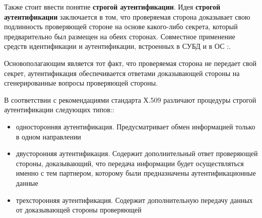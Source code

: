 Также стоит ввести понятие \textbf{строгой аутентификации}. Идея \textbf{строгой аутентификации}
заключается в том, что проверяемая сторона доказывает свою подлинность проверяющей стороне на
основе какого-либо секрета, который предварительно был размещен на обеих сторонах. Совместное
применение средств идентификации и аутентификации, встроенных в СУБД и в ОС \cite{crypto-methods}:.

Основополагающим является тот факт, что проверяемая сторона не передает свой секрет, аутентификация
обеспечивается ответами доказывающей стороны на сгенерированные вопросы проверяющей стороны.

В соответствии с рекомендациями стандарта Х.509 различают процедуры строгой аутентификации
следующих типов\cite{crypto-methods}::
\begin{itemize}
    \item односторонняя аутентификация. Предусматривает обмен информацией только в одном направлении
    \item двусторонняя аутентификация. Содержит дополнительный ответ проверяющей стороны,
        доказывающий, что передача информации будет осуществляться именно с тем партнером, которому
        были предназначены аутентификационные данные
    \item трехсторонняя аутентификация. Содержит дополнительную передачу данных от доказывающей
        стороны проверяющей
\end{itemize}

